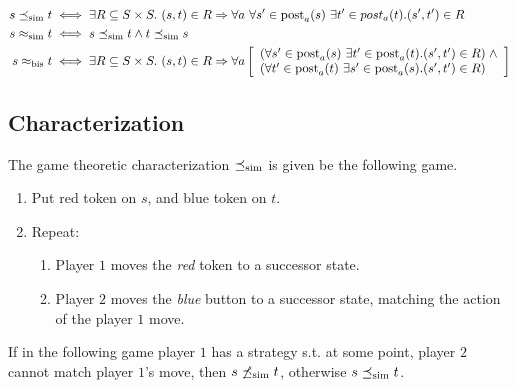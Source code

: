 \begin{theorem}
    \begin{align*}
        s \preceq_{\mathrm{sim}} t &\iff \exists R \subseteq S \times S.\ (s,t) \in R \Rightarrow \forall a\ \forall s' \in \operatorname{post}_a(s)\ \exists t' \in post_a(t).  (s', t') \in R  \\
          s \approx_{\mathrm{sim}} t &\iff s \preceq_{\mathrm{sim}} t \land  t \preceq_{\mathrm{sim}} s  \\
           s \approx_{\mathrm{bis}} t &\iff \exists R \subseteq S \times S.\ (s,t) \in R \Rightarrow \forall a\left[
            \begin{array}{l}
               ( \forall s' \in \operatorname{post}_a(s)\ \exists t' \in \operatorname{post}_a(t). (s', t') \in R )\; \land \\
                ( \forall t' \in \operatorname{post}_a(t)\ \exists s' \in \operatorname{post}_a(s). (s', t') \in R )
            \end{array}
        \right]
    \end{align*}
\end{theorem}


\subsection{Characterization}


\begin{theorem}
The game theoretic characterization  $\preceq_{\mathrm{sim}}$ is given be the following game.
\begin{enumerate}
    \item Put red token on $s$, and blue token on $t$.
    \item Repeat:
        \begin{enumerate}
            \item Player $1$ moves the \emph{red} token to a successor state.
            \item Player $2$ moves the \emph{blue} button to a successor state, matching the action of the player $1$ move.
        \end{enumerate}
\end{enumerate}
If in the following game player $1$ has a strategy s.t. at some point, player $2$ cannot match player $1$'s move, then $s \not\preceq_{\mathrm{sim}} t$, otherwise $s \preceq_{\mathrm{sim}} t$.
\end{theorem}


